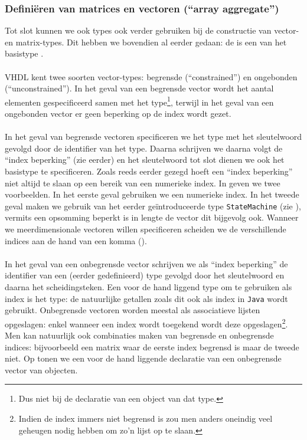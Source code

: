 \subsubsection{Defini\"eren van matrices en vectoren (``array aggregate'')}
Tot slot kunnen we ook types ook verder gebruiken bij de constructie van vector- en matrix-types. Dit hebben we bovendien al eerder gedaan: de  is een  van het basistype .

\paragraph{}
VHDL kent twee soorten vector-types: begrensde (``constrained'') en ongebonden (``unconstrained''). In het geval van een begrensde vector wordt het aantal elementen gespecificeerd samen met het type\footnote{Dus niet bij de declaratie van een object van dat type.}, terwijl in het geval van een ongebonden vector er geen beperking op de index wordt gezet.

\paragraph{}
In het geval van begrensde vectoren specificeren we het type met het sleutelwoord  gevolgd door de identifier van het type. Daarna schrijven we   daarna volgt de ``index beperking'' (zie eerder) en het sleutelwoord  tot slot dienen we ook het basistype te specificeren. Zoals reeds eerder gezegd hoeft een ``index beperking'' niet altijd te slaan op een bereik van een numerieke index. In  geven we twee voorbeelden. In het eerste geval gebruiken we een numerieke index. In het tweede geval maken we gebruik van het eerder ge\"introduceerde type \texttt{StateMachine} (zie ), vermits een opsomming beperkt is in lengte de vector dit bijgevolg ook. Wanneer we meerdimensionale vectoren willen specificeren scheiden we de verschillende indices aan de hand van een komma (\vhdltermen{,}).

\paragraph{}
In het geval van een onbegrensde vector schrijven we als ``index beperking'' de identifier van een (eerder gedefinieerd) type gevolgd door het  sleutelwoord en daarna het \vhdltermen{<>} scheidingsteken. Een voor de hand liggend type om te gebruiken als index is het  type: de natuurlijke getallen zoals dit ook als index in \texttt{Java} wordt gebruikt. Onbegrensde vectoren worden meestal als associatieve lijsten opgeslagen: enkel wanneer een index wordt toegekend wordt deze opgeslagen\footnote{Indien de index immers niet begrensd is zou men anders oneindig veel geheugen nodig hebben om zo'n lijst op te slaan.}. Men kan natuurlijk ook combinaties maken van begrensde en onbegrensde indices: bijvoorbeeld een matrix waar de eerste index begrensd is maar de tweede niet. Op  tonen we een voor de hand liggende declaratie van een onbegrensde vector van  objecten.

